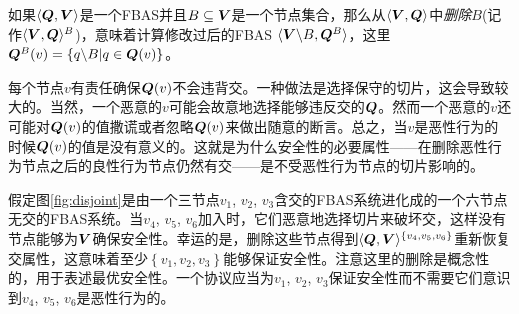 \begin{definition}[删除]
	如果$\langle{\bm Q},{\bm V}\rangle$是一个FBAS并且$B\subseteq {\bm V}$是一个节点集合，那么从$\langle{\bm V},{\bm Q}\rangle$中\textit{删除}$B$(记作$\langle{\bm V},{\bm Q}\rangle^B$)，意味着计算修改过后的FBAS $\langle{\bm V}\backslash B, {\bm Q}^B\rangle$，这里${\bm Q}^B(v)=\left\{q\backslash B|q\in{\bm Q(v)}\right\}$。
\end{definition}

每个节点$v$有责任确保${\bm Q}(v)$不会违背{\quorum}交。一种做法是选择保守的切片，这会导致较大的{\quorum}。当然，一个恶意的$v$可能会故意地选择能够违反{\quorum}交的${\bm Q}$。然而一个恶意的$v$还可能对${\bm Q}(v)$的值撒谎或者忽略${\bm Q}(v)$来做出随意的断言。总之，当$v$是恶性行为的时候${\bm Q}(v)$的值是没有意义的。这就是为什么安全性的必要属性——在删除恶性行为节点之后的良性行为节点仍然有{\quorum}交——是不受恶性行为节点的切片影响的。

假定图\ref{fig:disjoint}是由一个三节点$v_1$, $v_2$, $v_3$含{\quorum}交的FBAS系统进化成的一个六节点无{\quorum}交的FBAS系统。当$v_4$, $v_5$, $v_6$加入时，它们恶意地选择切片来破坏{\quorum}交，这样没有节点能够为${\bm V}$确保安全性。幸运的是，删除这些节点得到$\langle{\bm Q},{\bm V}\rangle^{\left\{v_4,v_5,v_6\right\}}$重新恢复{\quorum}交属性，这意味着至少$\left\{v_1,v_2,v_3\right\}$能够保证安全性。注意这里的删除是概念性的，用于表述最优安全性。一个协议应当为$v_1$, $v_2$, $v_3$保证安全性而不需要它们意识到$v_4$, $v_5$, $v_6$是恶性行为的。